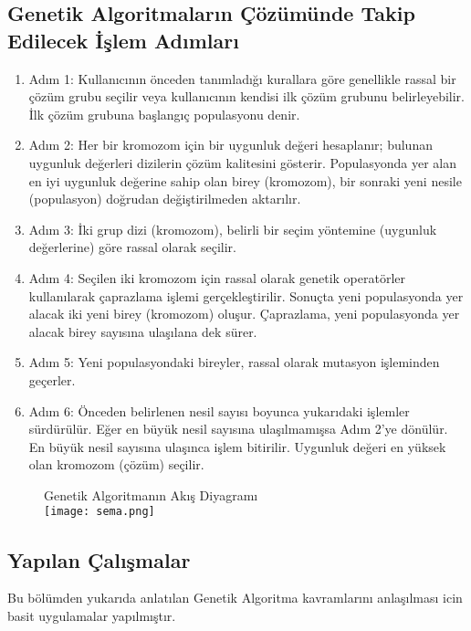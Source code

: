 \documentclass[12pt, a4paper]{article}
\begin{document}
\begin{flushleft}
	\subsection{Genetik Algoritmaların Çözümünde Takip Edilecek İşlem 
		Adımları}
	\begin{enumerate}
		\item Adım 1: Kullanıcının önceden tanımladığı kurallara göre genellikle rassal bir 
		çözüm grubu seçilir veya kullanıcının kendisi ilk çözüm grubunu belirleyebilir. İlk 
		çözüm grubuna başlangıç populasyonu denir.
		\item Adım 2: Her bir kromozom için bir uygunluk değeri hesaplanır; bulunan 
		uygunluk değerleri dizilerin çözüm kalitesini gösterir. Populasyonda yer alan en iyi 
		uygunluk değerine sahip olan birey (kromozom), bir sonraki yeni nesile (populasyon) 
		doğrudan değiştirilmeden aktarılır. 
		\item	Adım 3: İki grup dizi (kromozom), belirli bir seçim yöntemine (uygunluk 
		değerlerine) göre rassal olarak seçilir. 
		\item	Adım 4: Seçilen iki kromozom için rassal olarak genetik operatörler 
		kullanılarak çaprazlama işlemi gerçekleştirilir. Sonuçta yeni populasyonda yer alacak 
		iki yeni birey (kromozom) oluşur. Çaprazlama, yeni populasyonda yer alacak birey 
		sayısına ulaşılana dek sürer. 
		\item	Adım 5: Yeni populasyondaki bireyler, rassal olarak mutasyon işleminden 
		geçerler.
		\item	Adım 6: Önceden belirlenen nesil sayısı boyunca yukarıdaki işlemler 
		sürdürülür. Eğer en büyük nesil sayısına ulaşılmamışsa Adım 2’ye dönülür. En 
		büyük nesil sayısına ulaşınca işlem bitirilir. Uygunluk değeri en yüksek olan 
		kromozom (çözüm) seçilir.
	\end{enumerate}
	\newpage
	\begin{figure}[h]
		\item { Genetik Algoritmanın Akış Diyagramı} \cite{birougul2005genetik} \\[5pt]
		\centering
		\texttt{[image: sema.png]}
		\\[20pt]
	\end{figure}
	
	\clearpage
	\subsection{Yapılan Çalışmalar}
	Bu bölümden yukarıda anlatılan  Genetik Algoritma kavramlarını anlaşılması icin  basit  uygulamalar yapılmıştır.

\end{flushleft}
\end{document}
